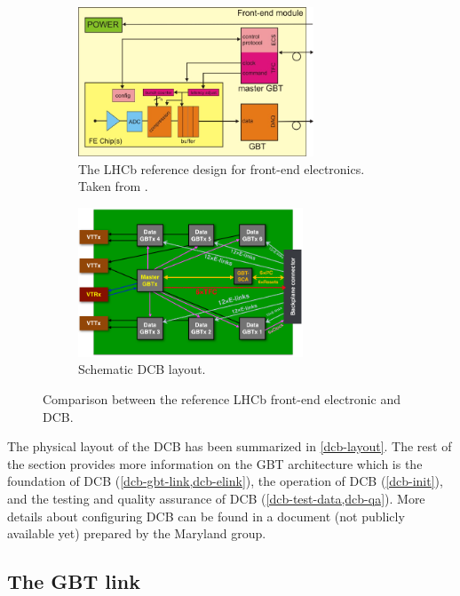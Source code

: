 \begin{figure}[!htb]
    \centering
    \begin{subfigure}[t]{0.46\textwidth}
        \centering
        \includegraphics[height=12em]{./figs-ut-upgrade/dcb/lhcb_ref_fe.pdf}
        \caption{
            The LHCb reference design for front-end electronics.
            Taken from \cite{Wyllie:2011sya}.
        }
        \label{fig:lhcb-ref-fe}
    \end{subfigure}
    \hfill
    \begin{subfigure}[t]{0.46\textwidth}
        \centering
        \includegraphics[height=12em]{./figs-ut-upgrade/dcb/dcb_schematic.pdf}
        \caption{
            Schematic DCB layout.
        }
        \label{fig:dcb-schematic}
    \end{subfigure}

    \caption{
        Comparison between the reference LHCb front-end electronic and DCB.
    }
\end{figure}

The physical layout of the DCB has been summarized in \cref{dcb-layout}.
The rest of the section provides more information
on the GBT architecture which is the foundation of DCB
(\cref{dcb-gbt-link,dcb-elink}),
the operation of DCB (\cref{dcb-init}),
and the testing and quality assurance of DCB (\cref{dcb-test-data,dcb-qa}).
More details about configuring DCB can be found in a document
(not publicly available yet) prepared by the Maryland group.


\subsection{The GBT link}
\label{dcb-gbt-link}

